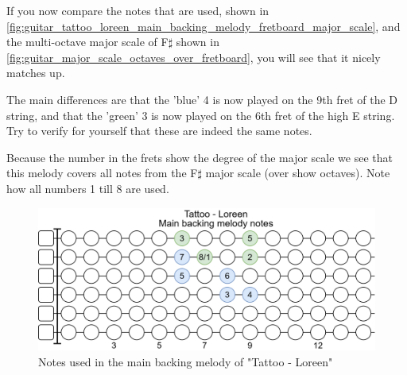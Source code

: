 If you now compare the notes that are used, shown in \autoref{fig:guitar_tattoo_loreen_main_backing_melody_fretboard_major_scale}, and the multi-octave major scale of F$\sharp$ shown in \autoref{fig:guitar_major_scale_octaves_over_fretboard}, you will see that it nicely matches up.

The main differences are that the 'blue' 4 is now played on the 9th fret of the D string, and that the 'green' 3 is now played on the 6th fret of the high E string. Try to verify for yourself that these are indeed the same notes.

Because the number in the frets show the degree of the major scale we see that this melody covers all notes from the F$\sharp$ major scale (over show octaves). Note how all numbers 1 till 8 are used.

\begin{figure}[h]
	\centering
	\includegraphics[height=0.2\textheight]{../../Images/NotesUsedInMainBackingMelodyTattooLoreen.png}
	\caption{Notes used in the main backing melody of "Tattoo - Loreen"}
	\label{fig:guitar_tattoo_loreen_main_backing_melody_fretboard_major_scale}
\end{figure}

\newpage


